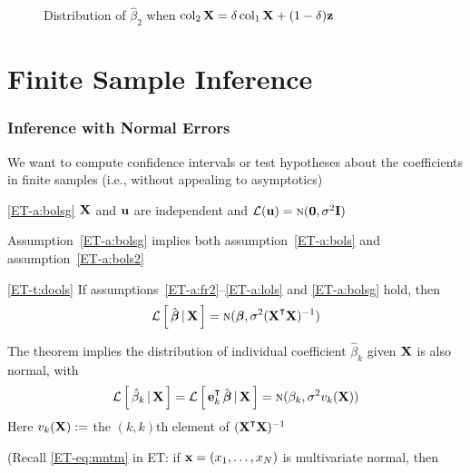 \begin{frame}

    \begin{figure}
    \centering
    \caption{\label{f:betahat_var} Distribution of $\hat \beta_2$ when $\operatorname{col}_2 \mathbf X = \delta \operatorname{col}_1 \mathbf X + (1 - \delta) {\mathbf z}$}
    \end{figure}
    
\end{frame}

\section{Finite Sample Inference}

\begin{frame}
    \frametitle{Inference with Normal Errors}

    \vspace{2em}
    We want to compute confidence intervals or test hypotheses about the
    coefficients in finite samples (i.e., without appealing to asymptotics)
    
    \vspace{.7em}
    \Ass
    \eqref{ET-a:bolsg}
    $\mathbf X$ and ${\mathbf u}$ are independent and $\mathcal L({\mathbf u}) = \textrm{\sc n}({\mathbf 0}, \sigma^2 \mathbf I)$
    
    Assumption~\ref{ET-a:bolsg} implies both assumption~\ref{ET-a:bols} and
    assumption~\ref{ET-a:bols2}
    
\end{frame}

\begin{frame}
    
    \vspace{2em}
    \Thm
    \eqref{ET-t:dools}
    If assumptions~\ref{ET-a:fr2}--\ref{ET-a:lols} and \ref{ET-a:bolsg} hold, then
    \begin{equation*}
        \lL \left[ \, \hboldbeta \given \boldX \, \right] 
        = \nN(\boldbeta, \sigma^2 (\boldX^\T \boldX)^{-1})
    \end{equation*}
    
    \vspace{.7em}
    The theorem implies the distribution of individual coefficient $\hat
    \beta_k$ given $\mathbf X$ is also normal, with
    \begin{equation}
        \label{eq:dicof}
        \lL \left[ \, \hat \beta_k \given \boldX \, \right] 
        = \lL \left[ \, \bolde_k^\T \, \hboldbeta  \given \boldX \, \right] 
        = \nN(\beta_k, \sigma^2 v_k(\boldX))
    \end{equation}
    Here $v_k (\mathbf X) :=$ the $(k,k)$th element of $(\boldX^\T \boldX)^{-1}$
    
    (Recall \eqref{ET-eq:mntm} in ET: if ${\mathbf x} = (x_1,
    \ldots, x_N)$ is multivariate normal, then 

\end{frame}

